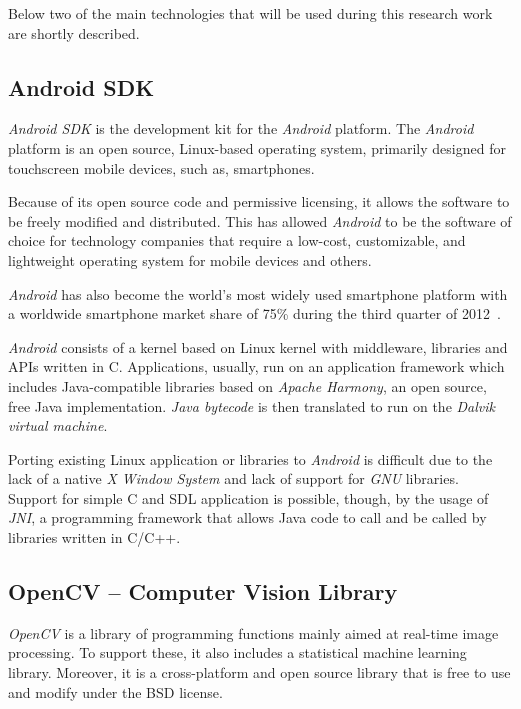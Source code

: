 Below two of the main technologies that will be used during this research
work are shortly described.

\subsection{Android SDK} \label{sec:sota:tech:android}

\emph{Android SDK} is the development kit for the \emph{Android}
platform. The \emph{Android} platform is an open source, Linux-based
operating system, primarily designed for touchscreen mobile devices,
such as, smartphones.

Because of its open source code and permissive licensing, it allows
the software to be freely modified and distributed. This has allowed
\emph{Android} to be the software of choice for technology companies
that require a low-cost, customizable, and lightweight operating system
for mobile devices and others.

\emph{Android} has also become the world's most widely used smartphone
platform with a worldwide smartphone market share of 75\%
during the third quarter of 2012~\cite{Idc2013Android}.

\emph{Android} consists of a kernel based on Linux kernel with middleware,
libraries and APIs written in C. Applications, usually, run on an application
framework which includes Java-compatible libraries based on
\emph{Apache Harmony}, an open source, free Java implementation.
\emph{Java bytecode} is then translated to run on the
\emph{Dalvik virtual machine}.

Porting existing Linux application or libraries to \emph{Android} is difficult
due to the lack of a native \emph{X Window System} and lack of support for
\emph{GNU} libraries. Support for simple C and SDL application is possible,
though, by the usage of \emph{JNI}, a programming framework that allows Java
code to call and be called by libraries written in C/C++.

\subsection{OpenCV -- Computer Vision Library} \label{sec:sota:tech:opencv}

\emph{OpenCV} is a library of programming functions mainly aimed at
real-time image processing. To support these, it also includes a
statistical machine learning library. Moreover, it is a cross-platform
and open source library that is free to use and modify under the BSD
license.

